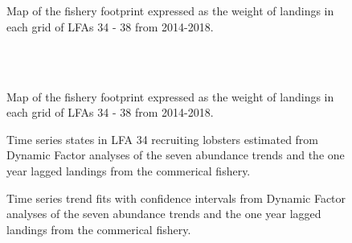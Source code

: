 \documentclass[11pt]{article}
\newcommand{\e}{/SpinDr/backup/bio_data/bio.lobster/figures/LFA3438Framework2019/} %
\begin{document}
\begin{figure}
        \centering
    \\
                \\
        
         \caption{Map of the fishery footprint expressed as the weight of landings in each grid of LFAs 34 - 38 from 2014-2018.}
        \end{figure}


\begin{figure}
        \centering
    \\
                \\
        
         \caption{Map of the fishery footprint expressed as the weight of landings in each grid of LFAs 34 - 38 from 2014-2018.}
        \end{figure}


   \begin{figure}
    \centering
        \caption{Time series states in LFA 34 recruiting lobsters estimated from Dynamic Factor analyses of the seven abundance trends and the one year lagged landings from the commerical fishery.}

    \end{figure}

\begin{figure}
    \centering
        \caption{Time series trend fits with confidence intervals from Dynamic Factor analyses of the seven abundance trends and the one year lagged landings from the commerical fishery.}

    \end{figure}
\end{document}
